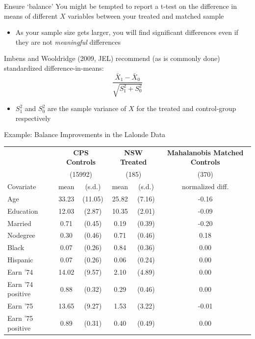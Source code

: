 \documentclass[aspectratio=169,t,11pt,table]{beamer}
\begin{document}
\begin{frame}{Ensure `balance'}
  You might be tempted to report a t-test on the difference in means of different $X$ variables between your treated and matched sample
  \begin{itemize}
    \item As your sample size gets larger, you will find significant differences even if they are not \emph{meaningful} differences
  \end{itemize}
  
  \bigskip
  Imbens and Wooldridge (2009, JEL) recommend (as is commonly done) standardized difference-in-means:
  $$
    \frac{\bar{X}_1 - \bar{X}_0}{\sqrt{S_1^2 + S_0^2}}
  $$
  \begin{itemize}
    \item $S_1^2$ and $S_0^2$ are the sample variance of $X$ for the treated and control-group respectively 
  \end{itemize}
\end{frame}

\begin{frame}{Example: Balance Improvements in the Lalonde Data} 
  \begin{table}   
    \footnotesize
    \begin{tabular}{l c c c c c}
      \toprule
      & \multicolumn{2}{c}{\textbf{CPS Controls}} & \multicolumn{2}{c}{\textbf{NSW Treated}} &  \multicolumn{1}{c}{\textbf{Mahalanobis Matched Controls}} \\
      & \multicolumn{2}{c}{(15992)} & \multicolumn{2}{c}{(185)} & (370) \\
      Covariate & mean & (s.d.) & mean & (s.d.) & normalized diff. \\

      \midrule
      Age & 33.23 & (11.05) & 25.82 & (7.16) & -0.16 \\
      Education & 12.03 & (2.87) & 10.35 & (2.01) & -0.09 \\
      Married & 0.71 & (0.45) & 0.19 & (0.39) & -0.20 \\
      Nodegree & 0.30 & (0.46) & 0.71 & (0.46) & 0.18 \\
      Black & 0.07 & (0.26) & 0.84 & (0.36) & 0.00 \\
      Hispanic & 0.07 & (0.26) & 0.06 & (0.24) & 0.00 \\
      Earn '74 & 14.02 & (9.57) & 2.10 & (4.89) & 0.00 \\
      Earn '74 positive & 0.88 & (0.32) & 0.29 & (0.46) & 0.00 \\
      Earn '75 & 13.65 & (9.27) & 1.53 & (3.22) & -0.01 \\
      Earn '75 positive & 0.89 & (0.31) & 0.40 & (0.49) & 0.00 \\
      \bottomrule
    \end{tabular}
  \end{table}
\end{frame}
\end{document}

